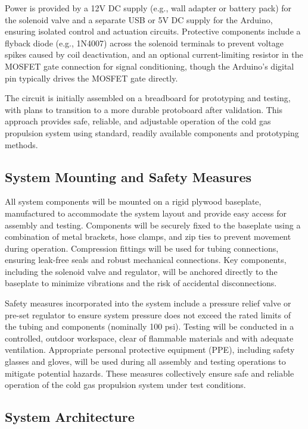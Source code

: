 \documentclass{new-aiaa}
\begin{document}
Power is provided by a 12V DC supply (e.g., wall adapter or battery pack) for the solenoid valve and a separate USB or 5V DC supply for the Arduino, ensuring isolated control and actuation circuits. Protective components include a flyback diode (e.g., 1N4007) across the solenoid terminals to prevent voltage spikes caused by coil deactivation, and an optional current-limiting resistor in the MOSFET gate connection for signal conditioning, though the Arduino’s digital pin typically drives the MOSFET gate directly.

The circuit is initially assembled on a breadboard for prototyping and testing, with plans to transition to a more durable protoboard after validation. This approach provides safe, reliable, and adjustable operation of the cold gas propulsion system using standard, readily available components and prototyping methods.


\subsection{System Mounting and Safety Measures}

All system components will be mounted on a rigid plywood baseplate, manufactured to accommodate the system layout and provide easy access for assembly and testing. Components will be securely fixed to the baseplate using a combination of metal brackets, hose clamps, and zip ties to prevent movement during operation. Compression fittings will be used for tubing connections, ensuring leak-free seals and robust mechanical connections. Key components, including the solenoid valve and regulator, will be anchored directly to the baseplate to minimize vibrations and the risk of accidental disconnections.

Safety measures incorporated into the system include a pressure relief valve or pre-set regulator to ensure system pressure does not exceed the rated limits of the tubing and components (nominally 100 psi). Testing will be conducted in a controlled, outdoor workspace, clear of flammable materials and with adequate ventilation. Appropriate personal protective equipment (PPE), including safety glasses and gloves, will be used during all assembly and testing operations to mitigate potential hazards. These measures collectively ensure safe and reliable operation of the cold gas propulsion system under test conditions.

\subsection{System Architecture}
\end{document}
